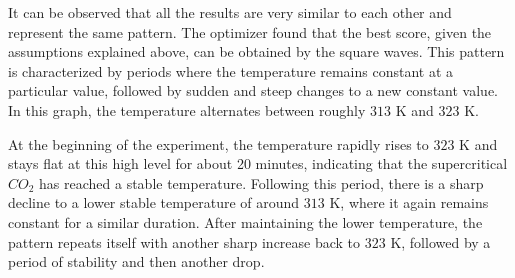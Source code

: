 \documentclass[]{scrartcl}
\begin{document}
It can be observed that all the results are very similar to each other and represent the same pattern. The optimizer found that the best score, given the assumptions explained above, can be obtained by the square waves. This pattern is characterized by periods where the temperature remains constant at a particular value, followed by sudden and steep changes to a new constant value. In this graph, the temperature alternates between roughly $313$ K and $323$ K.
 
At the beginning of the experiment, the temperature rapidly rises to $323$ K and stays flat at this high level for about 20 minutes, indicating that the supercritical $CO_2$ has reached a stable temperature. Following this period, there is a sharp decline to a lower stable temperature of around $313$ K, where it again remains constant for a similar duration. After maintaining the lower temperature, the pattern repeats itself with another sharp increase back to $323$ K, followed by a period of stability and then another drop.
\end{document}

